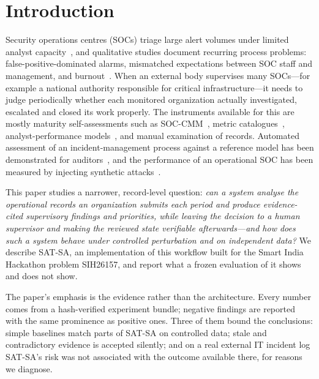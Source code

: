 \section{Introduction}
\label{sec:intro}

Security operations centres (SOCs) triage large alert volumes under limited analyst
capacity~\cite{vielberth2020soc,tariq2025alertfatigue}, and qualitative studies
document recurring process problems: false-positive-dominated alarms, mismatched
expectations between SOC staff and management, and burnout~\cite{alahmadi2022falsepositives,kokulu2019soc,sundaramurthy2015burnout}.
When an external body supervises many SOCs---for example a national authority
responsible for critical infrastructure---it needs to judge periodically whether
each monitored organization actually investigated, escalated and closed its work
properly. The instruments available for this are mostly maturity self-assessments
such as SOC-CMM~\cite{vanos2016soccmm}, metric catalogues~\cite{forsberg2023metrics},
analyst-performance models~\cite{agyepong2023analyst}, and manual examination of
records. Automated assessment of an incident-management process against a reference
model has been demonstrated for auditors~\cite{palma2024compliance}, and the
performance of an operational SOC has been measured by injecting synthetic
attacks~\cite{rosso2020saibersoc}.

This paper studies a narrower, record-level question: \emph{can a system analyse
the operational records an organization submits each period and produce
evidence-cited supervisory findings and priorities, while leaving the decision
to a human supervisor and making the reviewed state verifiable afterwards---and
how does such a system behave under controlled perturbation and on independent
data?} We describe SAT-SA, an implementation of this workflow built for the Smart
India Hackathon problem SIH26157, and report what a frozen evaluation of it shows
and does not show.

The paper's emphasis is the evidence rather than the architecture. Every number
comes from a hash-verified experiment bundle; negative findings are reported with
the same prominence as positive ones. Three of them bound the conclusions:
simple baselines match parts of SAT-SA on controlled data; stale and contradictory
evidence is accepted silently; and on a real external IT incident log SAT-SA's risk
was not associated with the outcome available there, for reasons we diagnose.

